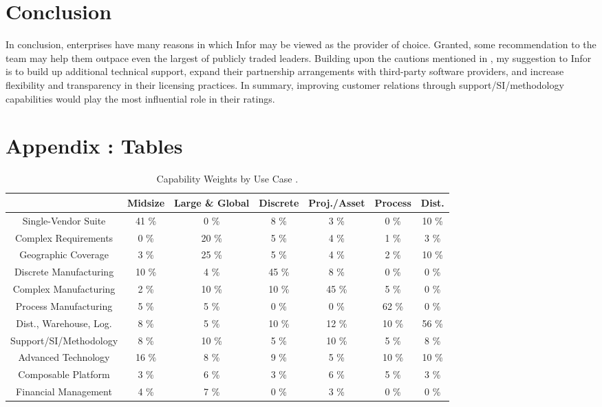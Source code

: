 \documentclass{article}
\begin{document}
\section{Conclusion}
In conclusion, enterprises have many reasons in which Infor may be viewed as the provider of choice. 
Granted, some recommendation to the team may help them outpace even the largest of publicly traded leaders. 
Building upon the cautions mentioned in \cite{magic_cloud_erp}, my suggestion to Infor is to build up additional technical support, expand their partnership arrangements with third-party software providers, and increase flexibility and transparency in their licensing practices. 
In summary, improving customer relations through support/SI/methodology capabilities would play the most influential role in their ratings. 

\newpage

\section{Appendix : Tables}

\begin{table}[h!]
    \centering
    \begin{tabular}{|c||c|c|c|c|c|c|} 
        \hline
        \          & Midsize & Large \& Global & Discrete & Proj./Asset & Process & Dist. \\
        \hline
        \hline
        Single-Vendor Suite     &  41 \%  &  0  \%  &  8  \%  &  3  \%  &  0  \%  &  10 \% \\
        \hline
        Complex Requirements    &  0  \%  &  20 \%  &  5  \%  &  4  \%  &  1  \%  &  3  \% \\
        \hline
        Geographic Coverage     &  3  \%  &  25 \%  &  5  \%  &  4  \%  &  2  \%  &  10 \% \\
        \hline
        Discrete Manufacturing  &  10 \%  &  4  \%  &  45 \%  &  8  \%  &  0  \%  &  0  \% \\
        \hline
        Complex Manufacturing   &  2  \%  &  10 \%  &  10 \%  &  45 \%  &  5  \%  &  0  \% \\
        \hline
        Process Manufacturing   &  5  \%  &  5  \%  &  0  \%  &  0  \%  &  62 \%  &  0  \% \\
        \hline
        Dist., Warehouse, Log.  &  8  \%  &  5  \%  &  10 \%  &  12 \%  &  10 \%  &  56 \% \\
        \hline
        Support/SI/Methodology  &  8  \%  &  10 \%  &  5  \%  &  10 \%  &  5  \%  &  8  \% \\
        \hline
        Advanced Technology     &  16 \%  &  8  \%  &  9  \%  &  5  \%  &  10 \%  &  10 \% \\
        \hline
        Composable Platform     &  3  \%  &  6  \%  &  3  \%  &  6  \%  &  5  \%  &  3  \% \\
        \hline
        Financial Management    &  4  \%  &  7  \%  &  0  \%  &  3  \%  &  0  \%  &  0  \% \\
        \hline
    \end{tabular}
    \caption{Capability Weights by Use Case \cite{critical_cloud_erp}.}
    \label{tab:cap_by_use}
\end{table}
\end{document}
